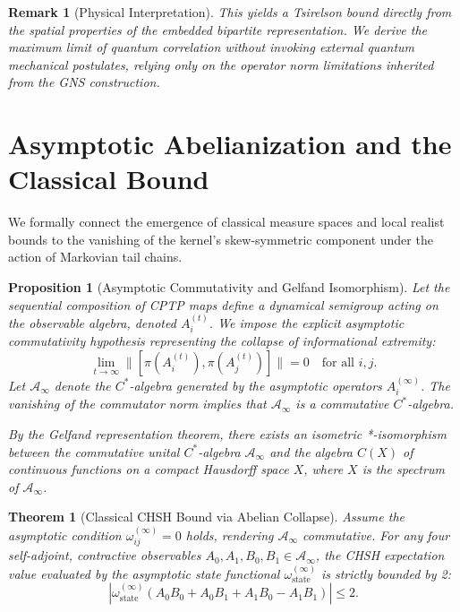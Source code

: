 \documentclass[11pt, a4paper]{article}
\newtheorem{theorem}{Theorem}
\newtheorem{proposition}{Proposition}
\newtheorem{remark}{Remark}
\begin{document}
\begin{remark}[Physical Interpretation]
This yields a Tsirelson bound directly from the spatial properties of the embedded bipartite representation. We derive the maximum limit of quantum correlation without invoking external quantum mechanical postulates, relying only on the operator norm limitations inherited from the GNS construction.
\end{remark}

\section{Asymptotic Abelianization and the Classical Bound}

We formally connect the emergence of classical measure spaces and local realist bounds to the vanishing of the kernel's skew-symmetric component under the action of Markovian tail chains.

\begin{proposition}[Asymptotic Commutativity and Gelfand Isomorphism]
Let the sequential composition of CPTP maps define a dynamical semigroup acting on the observable algebra, denoted $A_i^{(t)}$. We impose the explicit asymptotic commutativity hypothesis representing the collapse of informational extremity:
\begin{equation}
\lim_{t\to\infty}\|[\pi(A_i^{(t)}),\pi(A_j^{(t)})]\|=0\quad\text{for all }i,j.
\end{equation}
Let $\mathcal{A}_\infty$ denote the $C^*$-algebra generated by the asymptotic operators $A_i^{(\infty)}$. The vanishing of the commutator norm implies that $\mathcal{A}_\infty$ is a commutative $C^*$-algebra. 

By the Gelfand representation theorem, there exists an isometric *-isomorphism between the commutative unital $C^*$-algebra $\mathcal{A}_\infty$ and the algebra $C(X)$ of continuous functions on a compact Hausdorff space $X$, where $X$ is the spectrum of $\mathcal{A}_\infty$.
\end{proposition}

\begin{theorem}[Classical CHSH Bound via Abelian Collapse]
Assume the asymptotic condition $\omega_{ij}^{(\infty)} = 0$ holds, rendering $\mathcal{A}_\infty$ commutative. For any four self-adjoint, contractive observables $A_0, A_1, B_0, B_1 \in \mathcal{A}_\infty$, the CHSH expectation value evaluated by the asymptotic state functional $\omega_{\mathrm{state}}^{(\infty)}$ is strictly bounded by 2:
\begin{equation}
    |\omega_{\mathrm{state}}^{(\infty)}(A_0 B_0 + A_0 B_1 + A_1 B_0 - A_1 B_1)| \le 2.
\end{equation}
\end{theorem}
\end{document}

